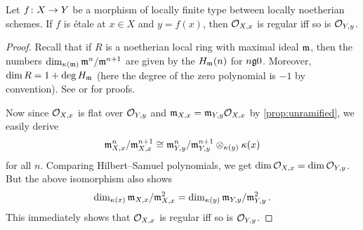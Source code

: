 \documentclass[a4paper, 10pt, oneside, DIV=9, chapterprefix=true, numbers=enddot, bibliography=totoc]{scrbook}
\begin{document}
\begin{prop}\label{prop:étaleRegular}
	Let $f\colon X\morphism Y$ be a morphism of locally finite type between locally noetherian schemes. If $f$ is étale at $x\in X$ and $y=f(x)$, then $\mathcal{O}_{X,x}$ is regular iff so is $\mathcal{O}_{Y,y}$.
\end{prop}
\begin{proof}
	Recall that if $R$ is a noetherian local ring with maximal ideal $\mathfrak{m}$, then the numbers $\dim_{\kappa(\mathfrak{m})}\mathfrak{m}^n/\mathfrak{m}^{n+1}$ are given by the  $H_{\mathfrak{m}}(n)$ for $n\gge 0$. Moreover, $\dim R=1+\deg H_{\mathfrak{m}}$ (here the degree of the zero polynomial is $-1$ by convention). See \cite[Chapter~12]{eisenbudCommAlg} or \cite[Theorem~20]{alg2} for proofs.
	
	Now since $\mathcal{O}_{X,x}$ is flat over $\mathcal{O}_{Y,y}$ and $\mathfrak{m}_{X,x}=\mathfrak{m}_{Y,y}\mathcal{O}_{X,x}$ by \cref{prop:unramified}, we easily derive
	\begin{equation*}
		\mathfrak{m}_{X,x}^n/\mathfrak{m}_{X,x}^{n+1}\cong \mathfrak{m}_{Y,y}^n/\mathfrak{m}_{Y,y}^{n+1}\otimes_{\kappa(y)}\kappa(x)
	\end{equation*}
	for all $n$. Comparing Hilbert--Samuel polynomials, we get $\dim \mathcal{O}_{X,x}=\dim\mathcal{O}_{Y,y}$. But the above isomorphism also shows
	\begin{equation*}
		\dim_{\kappa(x)}\mathfrak{m}_{X,x}/\mathfrak{m}_{X,x}^2=\dim_{\kappa(y)}\mathfrak{m}_{Y,y}/\mathfrak{m}_{Y,y}^2\,.
	\end{equation*}
	This immediately shows that $\mathcal{O}_{X,x}$ is regular iff so is $\mathcal{O}_{Y,y}$.
\end{proof}
\end{document}

